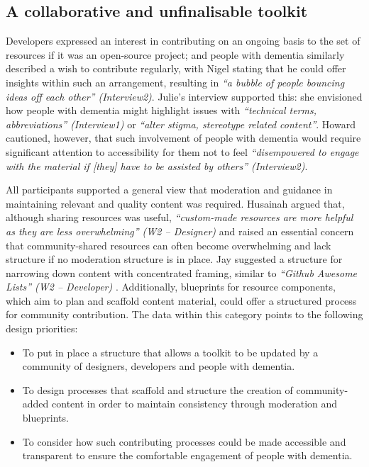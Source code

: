 \subsection{A collaborative and unfinalisable toolkit}
Developers expressed an interest in contributing on an ongoing basis to the set of resources if it was an open-source project; and people with dementia similarly described a wish to contribute regularly, with Nigel stating that he could offer insights within such an arrangement, resulting in \textit{``a bubble of people bouncing ideas off each other'' (Interview2)}. Julie’s interview supported this: she envisioned how people with dementia might highlight issues with \textit{``technical terms, abbreviations'' (Interview1)} or \textit{``alter stigma, stereotype related content''}. Howard cautioned, however, that such involvement of people with dementia would require significant attention to accessibility for them not to feel \textit{``disempowered to engage with the material if [they] have to be assisted by others'' (Interview2)}. 

All participants supported a general view that moderation and guidance in maintaining relevant and quality content was required. Husainah argued that, although sharing resources was useful, \textit{``custom-made resources are more helpful as they are less overwhelming'' (W2 – Designer)} and raised an essential concern that community-shared resources can often become overwhelming and lack structure if no moderation structure is in place. Jay suggested a structure for narrowing down content with concentrated framing, similar to \textit{``Github Awesome Lists'' (W2 – Developer) }. Additionally, blueprints for resource components, which aim to plan and scaffold content material, could offer a structured process for community contribution. The data within this category points to the following design priorities:

\begin{itemize}
\item To put in place a structure that allows a toolkit to be updated by a community of designers, developers and people with dementia.
\item To design processes that scaffold and structure the creation of community-added content in order to maintain consistency through moderation and blueprints.
\item To consider how such contributing processes could be made accessible and transparent to ensure the comfortable engagement of people with dementia.
\end{itemize}

